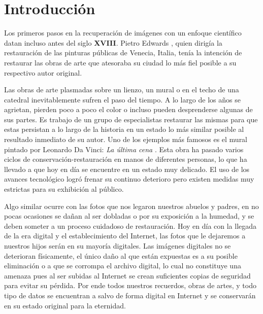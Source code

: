 \chapter*{Introducción}\label{chapter:introduction}

\qquad

Los primeros pasos en la recuperaci\'on de imágenes con un enfoque científico datan incluso antes del siglo \textbf{XVIII}. Pietro Edwards \cite{itwiki:PE}, quien dirigía la restauraci\'on de las pinturas p\'ublicas de Venecia, Italia, ten\'ia la intenci\'on de restaurar las obras de arte que atesoraba su ciudad lo m\'as fiel posible a su respectivo autor original.

Las obras de arte plasmadas sobre un lienzo, un mural o en el techo de una catedral inevitablemente sufren el paso del tiempo. A lo largo de los años se agrietan, pierden poco a poco el color o incluso pueden desprenderse algunas de sus partes. Es trabajo de un grupo de especialistas restaurar las mismas para que estas persistan a lo largo de la historia en un estado lo m\'as similar posible al resultado inmediato de su autor. Uno de los ejemplos m\'as famosos es el mural pintado por Leonardo Da Vinci: \textit{La \'ultima cena} \cite{wiki:CR-TLS}. Esta obra ha pasado varios ciclos de conservaci\'on-restauraci\'on en manos de diferentes personas, lo que ha llevado a que hoy en d\'ia se encuentre en un estado muy delicado. El uso de los avances tecnológico logr\'o frenar su continuo deterioro pero existen medidas muy estrictas para su exhibición al p\'ublico.

Algo similar ocurre con las fotos que nos legaron nuestros abuelos y padres, en no pocas ocasiones se dañan al ser dobladas o por su exposici\'on a la humedad, y se deben someter a un proceso cuidadoso de restauraci\'on. Hoy en d\'ia con la llegada de la era digital y el establecimiento del Internet, las fotos que le dejaremos a nuestros hijos ser\'an en su mayor\'ia digitales. Las im\'agenes digitales no se deterioran físicamente, el \'unico daño al que est\'an expuestas es a su posible eliminaci\'on o a que se corrompa el archivo digital, lo cual no constituye una amenaza pues al ser subidas al Internet se crean suficientes copias de seguridad para evitar su p\'erdida. Por ende todos nuestros recuerdos, obras de artes, y todo tipo de datos se encuentran a salvo de forma digital en Internet y se conservar\'an en su estado original para la eternidad.

